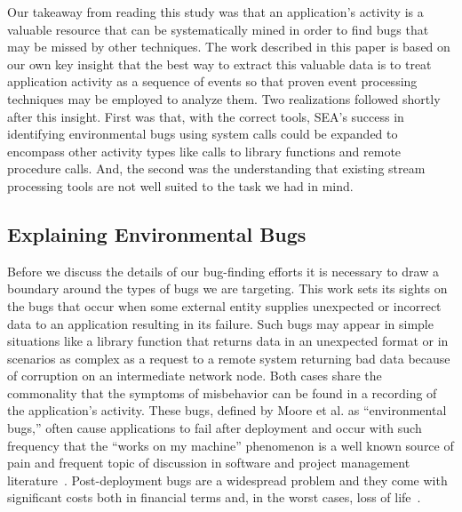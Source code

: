 Our takeaway
from reading this study
was that an application's activity
is a valuable resource that can be systematically mined
in order to find bugs
that may be missed by other techniques.
The work described in this paper
is based on our own key insight that the best way to extract this
valuable data
is to treat application activity
as a sequence of events
so that proven event processing techniques
may be employed to analyze them.
Two realizations followed shortly after this
insight.
First was that, with the correct tools,
SEA's success in identifying environmental bugs using system calls
could be expanded
to encompass other activity types
like calls to library functions
and remote procedure calls.
And, the second was the understanding that existing
stream processing tools
are not well suited to the
task we had in mind.



\subsection{Explaining Environmental Bugs}

Before we discuss the details of our bug-finding efforts it is necessary to
draw a boundary around the types of bugs we are targeting.
This work sets its sights on the bugs that occur when some external
entity supplies unexpected or incorrect data to an
application resulting in its failure.
Such bugs may appear in simple situations like a library function that
returns data in an unexpected format or in scenarios as complex
as a request to a remote
system returning bad data because of corruption on an intermediate network
node.
Both cases share the commonality that the symptoms of misbehavior
can be found in a recording of the application's activity.
These bugs, defined by Moore et al. as ``environmental bugs,''
often cause applications to fail after deployment
and occur with such frequency
that the ``works on my machine'' phenomenon is a well known
source of pain
and frequent topic of discussion
in software and project management
literature~\cite{worksonmymachine}.
Post-deployment bugs are a widespread problem
and they come with significant costs
both in financial terms and,
in the worst cases,
loss of life~\cite{WONG201768}.

